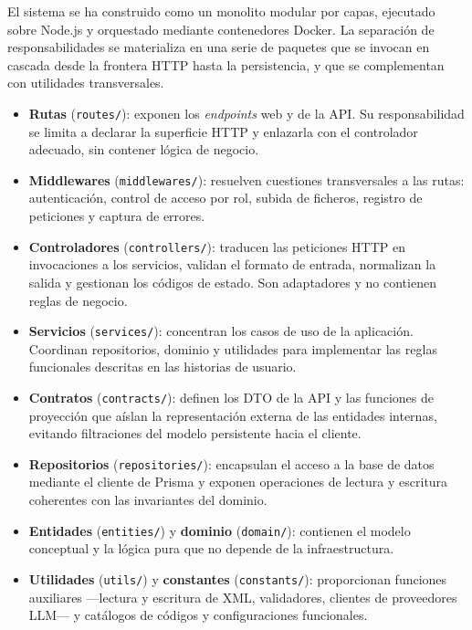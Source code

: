 El sistema se ha construido como un monolito modular por capas, ejecutado sobre
Node.js y orquestado mediante contenedores Docker. La separación de
responsabilidades se materializa en una serie de paquetes que se invocan en
cascada desde la frontera HTTP hasta la persistencia, y que se complementan con
utilidades transversales.

\begin{itemize}
	\item \textbf{Rutas} (\texttt{routes/}): exponen los \textit{endpoints} web y de la
	      API. Su responsabilidad se limita a declarar la superficie HTTP y enlazarla con
	      el controlador adecuado, sin contener lógica de negocio.
	\item \textbf{Middlewares} (\texttt{middlewares/}): resuelven cuestiones
	      transversales a las rutas: autenticación, control de acceso por rol, subida de
	      ficheros, registro de peticiones y captura de errores.
	\item \textbf{Controladores} (\texttt{controllers/}): traducen las peticiones HTTP en
	      invocaciones a los servicios, validan el formato de entrada, normalizan la
	      salida y gestionan los códigos de estado. Son adaptadores y no contienen reglas
	      de negocio.
	\item \textbf{Servicios} (\texttt{services/}): concentran los casos de uso de la
	      aplicación. Coordinan repositorios, dominio y utilidades para implementar las
	      reglas funcionales descritas en las historias de usuario.
	\item \textbf{Contratos} (\texttt{contracts/}): definen los DTO de la API y las
	      funciones de proyección que aíslan la representación externa de las entidades
	      internas, evitando filtraciones del modelo persistente hacia el cliente.
	\item \textbf{Repositorios} (\texttt{repositories/}): encapsulan el acceso a la base
	      de datos mediante el cliente de Prisma y exponen operaciones de lectura y
	      escritura coherentes con las invariantes del dominio.
	\item \textbf{Entidades} (\texttt{entities/}) y \textbf{dominio} (\texttt{domain/}):
	      contienen el modelo conceptual y la lógica pura que no depende de la
	      infraestructura.
	\item \textbf{Utilidades} (\texttt{utils/}) y \textbf{constantes}
	      (\texttt{constants/}): proporcionan funciones auxiliares ---lectura y escritura
	      de XML, validadores, clientes de proveedores LLM--- y catálogos de códigos y
	      configuraciones funcionales.
\end{itemize}

